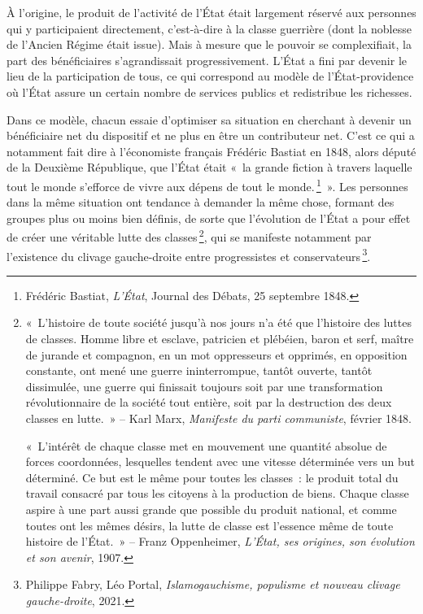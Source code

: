 \documentclass[a4paper,notitlepage]{article}
\newcommand{\eng}[1]{{\NoAutoSpaceBeforeFDP\emph{#1}}}  %
\newcommand{\sfootnote}{\,\footnote}
\begin{document}
À l'origine, le produit de l'activité de l'État était largement réservé aux personnes qui y participaient directement, c'est-à-dire à la classe guerrière (dont la noblesse de l'Ancien Régime était issue). Mais à mesure que le pouvoir se complexifiait, la part des bénéficiaires s'agrandissait progressivement. L'État a fini par devenir le lieu de la participation de tous, ce qui correspond au modèle de l'État-providence où l'État assure un certain nombre de services publics et redistribue les richesses.

Dans ce modèle, chacun essaie d'optimiser sa situation en cherchant à devenir un bénéficiaire net du dispositif et ne plus en être un contributeur net. C'est ce qui a notamment fait dire à l'économiste français Frédéric Bastiat en 1848, alors député de la Deuxième République, que l'État était «~la grande fiction à travers laquelle tout le monde s'efforce de vivre aux dépens de tout le monde.\sfootnote{Frédéric Bastiat, \emph{L'État}, Journal des Débats, 25 septembre 1848.}~». Les personnes dans la même situation ont tendance à demander la même chose, formant des groupes plus ou moins bien définis, de sorte que l'évolution de l'État a pour effet de créer une véritable lutte des classes\sfootnote{«~L'histoire de toute société jusqu'à nos jours n'a été que l'histoire des luttes de classes. Homme libre et esclave, patricien et plébéien, baron et serf, maître de jurande et compagnon, en un mot oppresseurs et opprimés, en opposition constante, ont mené une guerre ininterrompue, tantôt ouverte, tantôt dissimulée, une guerre qui finissait toujours soit par une transformation révolutionnaire de la société tout entière, soit par la destruction des deux classes en lutte.~» -- Karl Marx, \eng{Manifeste du parti communiste}, février 1848.

«~L'intérêt de chaque classe met en mouvement une quantité absolue de forces coordonnées, lesquelles tendent avec une vitesse déterminée vers un but déterminé. Ce but est le même pour toutes les classes~: le produit total du travail consacré par tous les citoyens à la production de biens. Chaque classe aspire à une part aussi grande que possible du produit national, et comme toutes ont les mêmes désirs, la lutte de classe est l'essence même de toute histoire de l'État.~» -- Franz Oppenheimer, \emph{L'État, ses origines, son évolution et son avenir}, 1907.}, qui se manifeste notamment par l'existence du clivage gauche-droite entre progressistes et conservateurs\sfootnote{Philippe Fabry, Léo Portal, \emph{Islamogauchisme, populisme et nouveau clivage gauche-droite}, 2021.}.
\end{document}
